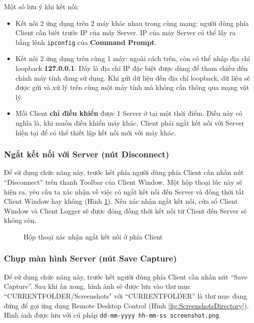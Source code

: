 Một số lưu ý khi kết nối:
\begin{itemize}
	\item  Kết nối 2 ứng dụng trên 2 máy khác nhau trong cùng mạng: người dùng phía Client cần biết trước IP của máy Server. IP của máy Server có thể lấy ra bằng lệnh \verb|ipconfig| của \textbf{Command Prompt}.
	\item Kết nối 2 ứng dụng trên cùng 1 máy: ngoài cách trên, còn có thể nhập địa chỉ loopback \textbf{127.0.0.1}. Đây là địa chỉ IP đặc biệt được dùng để tham chiếu đến chính máy tính đang sử dụng. Khi gửi dữ liệu đến địa chỉ loopback, dữ liệu sẽ được gửi và xử lý trên cùng một máy tính mà không cần thông qua mạng vật lý.
	\item Mỗi Client \textbf{chỉ điều khiển} được 1 Server ở tại một thời điểm. Điều này có nghĩa là, khi muốn điều khiển máy khác, Client phải ngắt kết nối với Server hiện tại để có thể thiết lập kết nối mới với máy khác.
\end{itemize}

\subsubsection{Ngắt kết nối với Server (nút Disconnect)}
Để sử dụng chức năng này, trước hết phía người dùng phía Client cần nhấn nút ``Disconnect'' trên thanh Toolbar của Client Window. Một hộp thoại lúc này sẽ hiện ra, yêu cầu ta xác nhận về việc có ngắt kết nối đến Server và đồng thời tắt Client Window hay không (Hình \ref{fig:ClientDisconnectDialog}). Nếu xác nhận ngắt kết nối, cửa sổ Client Window và Client Logger sẽ được đóng đồng thời kết nối từ Client đến Server sẽ không còn.

\begin{figure}[H]
	\caption{Hộp thoại xác nhận ngắt kết nối ở phía Client}
	\label{fig:ClientDisconnectDialog}
\end{figure}

\subsubsection{Chụp màn hình Server (nút Save Capture)}\label{subsubsec:saveCapture}
Để sử dụng chức năng này, trước hết người dùng phía Client cần nhấn nút ``Save Capture''. Sau khi ấn xong, hình ảnh sẽ được lưu vào thư mục ``CURRENTFOLDER\slash Screenshots" với ``CURRENTFOLDER'' là thư mục đang đứng để gọi ứng dụng Remote Desktop Control (Hình \ref{fig:ScreenshotsDirectory}). Hình ảnh được lưu với cú pháp \newline \noindent \verb|dd-mm-yyyy hh-mm-ss screenshot.png|. 

